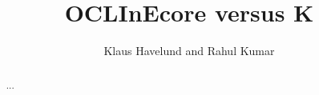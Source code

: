 \documentclass{llncs}
\title{OCLInEcore versus K}
\author{Klaus Havelund and Rahul Kumar}
\institute{
  Jet Propulsion Laboratory\\
  California Institute of Technology\\
  California, USA
}
\begin{document}
\maketitle

\begin{abstract}
...
\end{abstract}










\appendix
%
\end{document}
